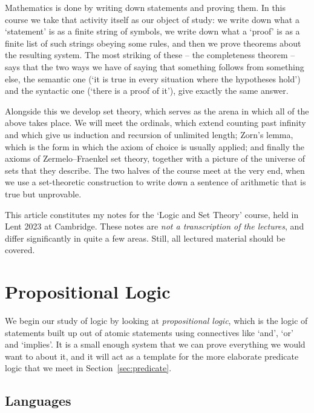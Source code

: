 



Mathematics is done by writing down statements and proving them. In this course we take that activity itself as our object of study: we write down what a `statement' is as a finite string of symbols, we write down what a `proof' is as a finite list of such strings obeying some rules, and then we prove theorems about the resulting system. The most striking of these -- the completeness theorem -- says that the two ways we have of saying that something follows from something else, the semantic one (`it is true in every situation where the hypotheses hold') and the syntactic one (`there is a proof of it'), give exactly the same answer.

Alongside this we develop set theory, which serves as the arena in which all of the above takes place. We will meet the ordinals, which extend counting past infinity and which give us induction and recursion of unlimited length; Zorn's lemma, which is the form in which the axiom of choice is usually applied; and finally the axioms of Zermelo--Fraenkel set theory, together with a picture of the universe of sets that they describe. The two halves of the course meet at the very end, when we use a set-theoretic construction to write down a sentence of arithmetic that is true but unprovable.

This article constitutes my notes for the `Logic and Set Theory' course, held in Lent 2023 at Cambridge. These notes are \emph{not a transcription of the lectures}, and differ significantly in quite a few areas. Still, all lectured material should be covered.



\section{Propositional Logic}

We begin our study of logic by looking at \emph{propositional logic}, which is the logic of statements built up out of atomic statements using connectives like `and', `or' and `implies'. It is a small enough system that we can prove everything we would want to about it, and it will act as a template for the more elaborate predicate logic that we meet in Section~\ref{sec:predicate}.

\subsection{Languages}

